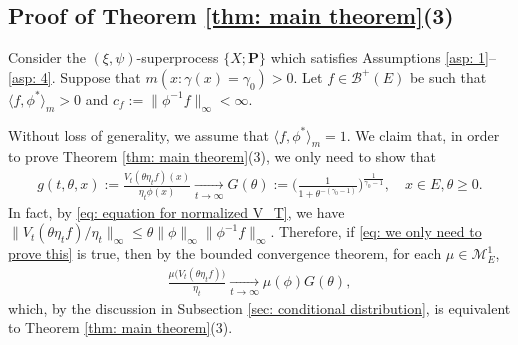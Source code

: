 \documentclass[UTF8]{pkuthss}
\theoremstyle{plain}
\theoremstyle{definition}
\numberwithin{equation}{section}
\begin{document}
\subsection{Proof of Theorem \ref{thm: main theorem}(3)}
\label{sec: proof of result 3}
	Consider the $(\xi, \psi)$-superprocess $\{X;\mathbf P\}$ which satisfies
	Assumptions \ref{asp: 1}--\ref{asp: 4}.
	Suppose that $m( x:\gamma(x)=\gamma_0 )>0$.
	Let $f \in \mathscr B^+(E)$ be  such that $ \langle f, \phi^* \rangle_m > 0$  and $c_f :=\| \phi^{-1}f \|_\infty < \infty$.
	
	Without loss of generality, we assume that $\langle f, \phi^* \rangle_m = 1$.
	We claim that, in order to prove Theorem \ref{thm: main theorem}(3), we only need to show that
\begin{align}\label{eq: we only need to prove this}
	g(t,\theta,x)
	:=\frac{V_t (\theta \eta_t f) (x)}{\eta_t \phi(x)}
	\xrightarrow[t\to \infty]{} G(\theta)
	:= \Big( \frac{1}{1+\theta^{-(\gamma_0 - 1)}} \Big)^{ \frac{1}{\gamma_0 - 1} },
	\quad x\in E, \theta \geq 0.
\end{align}
	In fact, by \eqref{eq: equation for normalized V_T}, we have $\|V_t(\theta \eta_t f)/ \eta_t \|_\infty \leq \theta \|\phi\|_\infty \|\phi^{-1}f\|_\infty.$
	Therefore, if \eqref{eq: we only need to prove this} is true, then by the bounded convergence theorem, for each $\mu \in \mathcal M^1_E$,
\begin{align}
	\frac{\mu\big(V_t (\theta \eta_t f)\big)}{\eta_t }
	\xrightarrow[t\to \infty]{} \mu(\phi)G(\theta),
\end{align}
	which, by the discussion in Subsection \ref{sec: conditional distribution}, is equivalent to Theorem \ref{thm: main theorem}(3).
		
\end{document}
